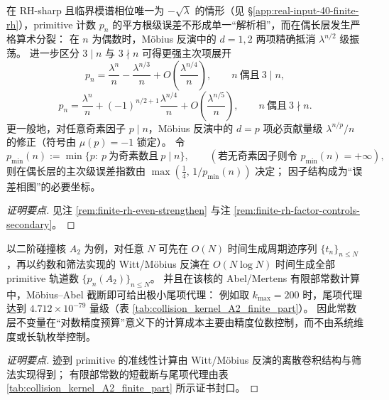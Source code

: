 \begin{conclusion}\label{con:xi-terminal-rhsharp-arithmetic-phase-splitting}
在 RH-sharp 且临界模谱相位唯一为 \(-\sqrt\lambda\) 的情形（见 \S\ref{app:real-input-40-finite-rh}），primitive 计数 \(p_n\) 的平方根级误差不形成单一“解析相”，而在偶长层发生严格算术分裂：
在 \(n\) 为偶数时，Möbius 反演中的 \(d=1,2\) 两项精确抵消 \(\lambda^{n/2}\) 级振荡。
进一步区分 \(3\mid n\) 与 \(3\nmid n\) 可得更强主次项展开
\[
p_n=\frac{\lambda^n}{n}-\frac{\lambda^{n/3}}{n}+O\!\left(\frac{\lambda^{n/4}}{n}\right),
\qquad n\ \text{偶且}\ 3\mid n,
\]
\[
p_n=\frac{\lambda^n}{n}+(-1)^{n/2+1}\frac{\lambda^{n/4}}{n}+O\!\left(\frac{\lambda^{n/5}}{n}\right),
\qquad n\ \text{偶且}\ 3\nmid n.
\]
更一般地，对任意奇素因子 \(p\mid n\)，Möbius 反演中的 \(d=p\) 项必贡献量级 \(\lambda^{n/p}/n\) 的修正（符号由 \(\mu(p)=-1\) 锁定）。
令
\[
p_{\min}(n):=\min\{p:\ p\ \text{为奇素数且}\ p\mid n\},
\qquad(\text{若无奇素因子则令 }p_{\min}(n)=+\infty),
\]
则在偶长层的主次级误差指数由 \(\max(\tfrac14,\,1/p_{\min}(n))\) 决定；
因子结构成为“误差相图”的必要坐标。
\end{conclusion}
\begin{proof}[证明要点]
见注 \ref{rem:finite-rh-even-strengthen} 与注 \ref{rem:finite-rh-factor-controls-secondary}。
\end{proof}

\begin{conclusion}\label{con:xi-terminal-constant-layer-bit-complexity}
以二阶碰撞核 \(A_2\) 为例，对任意 \(N\) 可先在 \(O(N)\) 时间生成周期迹序列 \(\{t_n\}_{n\le N}\)，再以约数和筛法实现的 Witt/Möbius 反演在 \(O(N\log N)\) 时间生成全部 primitive 轨道数 \(\{p_n(A_2)\}_{n\le N}\)。
并且在该核的 Abel/Mertens 有限部常数计算中，Möbius--Abel 截断即可给出极小尾项代理：
例如取 \(k_{\max}=200\) 时，尾项代理达到 \(4.712\times 10^{-79}\) 量级（表 \ref{tab:collision_kernel_A2_finite_part}）。
因此常数层不变量在“对数精度预算”意义下的计算成本主要由精度位数控制，而不由系统维度或长轨枚举控制。
\end{conclusion}
\begin{proof}[证明要点]
迹到 primitive 的准线性计算由 Witt/Möbius 反演的离散卷积结构与筛法实现得到；
有限部常数的短截断与尾项代理由表 \ref{tab:collision_kernel_A2_finite_part} 所示证书封口。
\end{proof}


